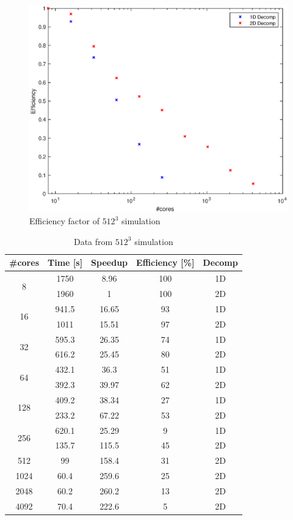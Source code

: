 \begin{figure}
\begin{center}
\includegraphics[scale=0.6]{grafici/5123}
\caption{Efficiency factor of $512^3$ simulation}
\label{5123}
\end{center}
\end{figure}

\begin{table}[h]
\caption{Data from $512^{3}$ simulation}
\begin{center}
\begin{tabular}{c c c c c}
\toprule
\textbf{\#cores} & \textbf{Time [s]} & \textbf{Speedup} & \textbf{Efficiency [\%]} & \textbf{Decomp}\\
\midrule
\multirow{2}{*}{8} & 1750 & 8.96 & 100 &1D\\
& 1960 & 1 & 100 & 2D\\
\hline
\multirow{2}{*}{16} & 941.5 & 16.65 & 93 & 1D\\
& 1011 & 15.51 & 97 & 2D\\
\hline
\multirow{2}{*}{32} & 595.3 & 26.35 & 74 & 1D\\
& 616.2 & 25.45 & 80 & 2D\\
\hline
\multirow{2}{*}{64} & 432.1 & 36.3 & 51 & 1D\\
& 392.3 & 39.97 & 62 & 2D\\
\hline
\multirow{2}{*}{128} & 409.2 & 38.34 & 27 & 1D\\
& 233.2 & 67.22 & 53 & 2D\\
\hline
\multirow{2}{*}{256} & 620.1 & 25.29 & 9 & 1D\\
& 135.7 & 115.5 & 45 & 2D\\
\hline
512 & 99 & 158.4 & 31 & 2D\\
1024 & 60.4 & 259.6 & 25  & 2D \\
2048 & 60.2 & 260.2 & 13  & 2D \\
4092 & 70.4 & 222.6 & 5 & 2D\\
\bottomrule
\end{tabular}
\end{center}
\label{512data}
\end{table}

